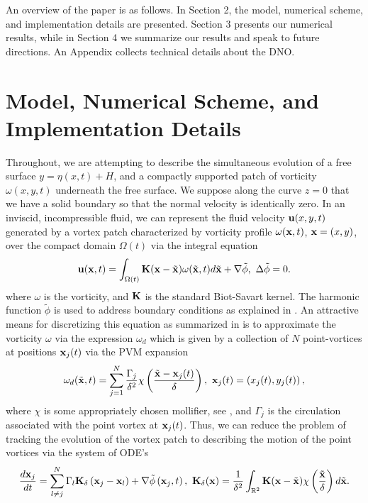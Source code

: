 \documentclass[a4paper,11pt]{article}
\begin{document}
An overview of the paper is as follows.  In Section 2, the model, numerical scheme, and implementation details are presented.  Section 3 presents our numerical results, while in Section 4 we summarize our results and speak to future directions.  An Appendix collects technical details about the DNO.  
\section{Model, Numerical Scheme, and Implementation Details}
Throughout, we are attempting to describe the simultaneous evolution of a free surface $y = \eta(x,t) + H$, and a compactly supported patch of vorticity $\omega(x,y,t)$ underneath the free surface.  We suppose along the curve $z=0$ that we have a solid boundary so that the normal velocity is identically zero.  In an inviscid, incompressible fluid, we can represent the fluid velocity ${\bf u}(x,y,t)$ generated by a vortex patch characterized by vorticity profile $\omega({\bf x},t)$, ${\bf x}=(x,y)$, over the compact domain $\Omega(t)$ via the integral equation
\[
{\bf u}({\bf x},t) = \int_{\Omega(t)} {\bf K}({\bf x}-\tilde{{\bf x}})\omega(\tilde{{\bf x}},t)d\tilde{{\bf x}} + \nabla \tilde{\phi}, ~ \Delta \tilde{\phi} = 0.
\]
where $\omega$ is the vorticity, and ${\bf K}$ is the standard Biot-Savart kernel.  The harmonic function $\tilde{\phi}$ is used to address boundary conditions as explained in \cite{saffman}.  An attractive means for discretizing this equation as summarized in \cite{cottet} is to approximate the vorticity $\omega$ via the expression $\omega_{d}$ which is given by a collection of $N$ point-vortices at positions ${\bf x}_{j}(t)$ via the PVM expansion
\begin{equation}
\omega_{d}(\tilde{{\bf x}},t) = \sum_{j=1}^{N} \frac{\Gamma_{j}}{\delta^{2}}\chi\left(\frac{\tilde{{\bf x}}-{\bf x}_{j}(t)}{\delta}\right), ~ {\bf x}_{j}(t) = \left(x_{j}(t),y_{j}(t) \right),
\label{discvort} 
\end{equation}
where $\chi$ is some appropriately chosen mollifier, see \cite{beale}, and $\Gamma_{j}$ is the circulation associated with the point vortex at ${\bf x}_{j}(t)$.  Thus, we can reduce the problem of tracking the evolution of the vortex patch to describing the motion of the point vortices via the system of ODE's
\[
\frac{d{\bf x}_{j}}{dt}  =  \sum_{l\neq j}^{N} \Gamma_{l} {\bf K}_{\delta}\left({\bf x}_{j}-{\bf x}_{l}\right) + \nabla \tilde{\phi}\left({\bf x}_{j},t\right), ~ {\bf K}_{\delta}({\bf x}) = \frac{1}{\delta^{2}}\int_{\mathbb{R}^{2}}{\bf K}({\bf x} - \tilde{\bf x})\chi \left(\frac{\tilde{{\bf x}}}{\delta} \right) d \tilde{{\bf x}}.
\]
\end{document}
